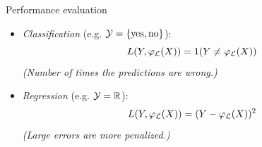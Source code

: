 \documentclass{beamer}
\begin{document}
\begin{frame}{Performance evaluation}

\begin{itemize}

\item {\it Classification} (e.g. ${\cal Y} = \{ \text{yes}, \text{no} \}$):
  $$L(Y, \varphi_{\cal L}(X)) = 1(Y \neq \varphi_{\cal L}(X))$$
  {\it \footnotesize (Number of times the predictions are wrong.)}

\vspace{1cm}

\item {\it Regression} (e.g. ${\cal Y} = \mathbb{R}$):
  $$L(Y, \varphi_{\cal L}(X)) = (Y - \varphi_{\cal L}(X))^2$$
  {\it \footnotesize (Large errors are more penalized.)}

\end{itemize}

\end{frame}


\end{document}
